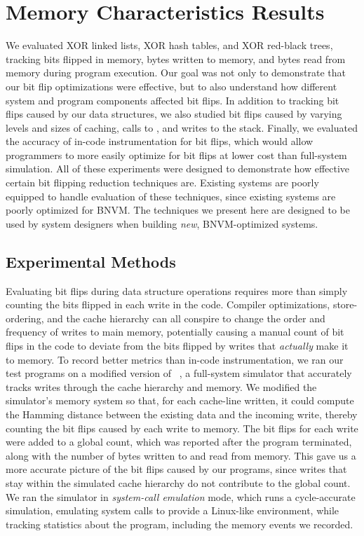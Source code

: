 \section{Memory Characteristics Results}
\label{sec:evaluation}

We evaluated XOR linked lists, XOR hash tables, and XOR red-black trees,
tracking bits flipped in memory, bytes written to memory, and bytes read from
memory during program execution. Our goal was not only to demonstrate that our
bit flip optimizations were effective, but to also understand how different
system and program components affected bit flips. In addition to tracking bit
flips caused by our data structures, we also studied bit flips caused by varying
levels and sizes of caching, calls to \malloc, and writes to the stack. Finally, we evaluated the
accuracy of in-code instrumentation for bit flips, which would allow programmers
to more easily optimize for bit flips at lower cost than full-system simulation.
All of these experiments were designed to demonstrate how effective certain bit flipping reduction
techniques are. Existing systems are poorly equipped to handle evaluation of these techniques, since
existing systems are poorly optimized for BNVM. The techniques we present here are designed to be
used by system designers when building \emph{new}, BNVM-optimized systems.

\subsection{Experimental Methods}


Evaluating bit flips during data structure operations requires more than simply
counting the bits flipped in each write in the code. Compiler optimizations,
store-ordering, and the cache hierarchy can all conspire to change the order and
frequency of writes to main memory, potentially causing a manual count of bit
flips in the code to deviate from the bits flipped by writes that
\textit{actually} make it to memory. To record better metrics than in-code
instrumentation, we ran our test programs on a modified version of \gem~\cite{gem5}, a full-system
simulator that accurately tracks writes through the cache hierarchy and
memory. We modified the simulator's memory system so that, for each
cache-line written, it could compute the Hamming distance between the existing
data and the incoming write, thereby counting the bit flips caused by each
write to memory. The bit flips for each write were added to a global count,
which was reported after the program terminated, along with the number of bytes
written to and read from memory. This gave us a more accurate picture of the bit
flips caused by our programs, since writes that stay within the simulated cache
hierarchy do not contribute to the global count.
We ran the simulator in
\textit{system-call emulation} mode, which runs a cycle-accurate simulation,
emulating system calls to provide a Linux-like environment, while
tracking statistics about the program, including the memory events we recorded.




